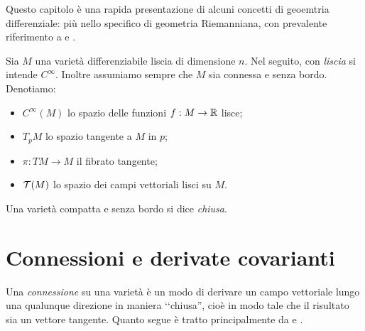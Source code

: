 Questo capitolo è una rapida presentazione di alcuni concetti di geoemtria differenziale: più nello specifico di geometria Riemanniana, con prevalente riferimento a \cite[Part~II]{milnor1963morse} e \cite[Capitoli~6-7]{abate2011geometria}.

Sia \(M\) una varietà differenziabile liscia di dimensione \(n\). Nel seguito, con \textit{liscia} si intende \(C^\infty\). Inoltre assumiamo sempre che \(M\) sia connessa e senza bordo. Denotiamo:
\begin{itemize}[label=]
	\item \(C^\infty(M)\) lo spazio delle funzioni \(f:M \to \mathbb{R}\) lisce;
	\item \(T_pM\) lo spazio tangente a \(M\) in \(p\);
	\item \(\pi: TM \to M\) il fibrato tangente;
	\item \(\mathcal{T}(M)\) lo spazio dei campi vettoriali lisci su \(M\).
\end{itemize}

\begin{defi}
	Una varietà compatta e senza bordo si dice \textit{chiusa}. 
\end{defi}

\section{Connessioni e derivate covarianti}
	
	Una \textit{connessione} su una varietà è un modo di derivare un campo vettoriale lungo una qualunque direzione in maniera ‘‘chiusa'', cioè in modo tale che il risultato sia un vettore tangente. Quanto segue è tratto principalmente da \cite[Chapter~8]{milnor1963morse} e \cite[Sezione~6.1]{abate2011geometria}.
	
